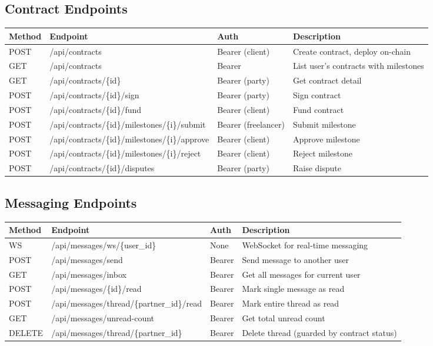 \documentclass[12pt,a4paper]{article}
\begin{document}
\subsection{Contract Endpoints}

\begin{longtable}{lllX}
\toprule
\textbf{Method} & \textbf{Endpoint} & \textbf{Auth} & \textbf{Description} \\
\midrule
\endhead
POST & /api/contracts & Bearer (client) & Create contract, deploy on-chain \\
GET & /api/contracts & Bearer & List user's contracts with milestones \\
GET & /api/contracts/\{id\} & Bearer (party) & Get contract detail \\
POST & /api/contracts/\{id\}/sign & Bearer (party) & Sign contract \\
POST & /api/contracts/\{id\}/fund & Bearer (client) & Fund contract \\
POST & /api/contracts/\{id\}/milestones/\{i\}/submit & Bearer (freelancer) & Submit milestone \\
POST & /api/contracts/\{id\}/milestones/\{i\}/approve & Bearer (client) & Approve milestone \\
POST & /api/contracts/\{id\}/milestones/\{i\}/reject & Bearer (client) & Reject milestone \\
POST & /api/contracts/\{id\}/disputes & Bearer (party) & Raise dispute \\
\bottomrule
\end{longtable}

\subsection{Messaging Endpoints}

\begin{longtable}{lllX}
\toprule
\textbf{Method} & \textbf{Endpoint} & \textbf{Auth} & \textbf{Description} \\
\midrule
\endhead
WS & /api/messages/ws/\{user\_id\} & None & WebSocket for real-time messaging \\
POST & /api/messages/send & Bearer & Send message to another user \\
GET & /api/messages/inbox & Bearer & Get all messages for current user \\
POST & /api/messages/\{id\}/read & Bearer & Mark single message as read \\
POST & /api/messages/thread/\{partner\_id\}/read & Bearer & Mark entire thread as read \\
GET & /api/messages/unread-count & Bearer & Get total unread count \\
DELETE & /api/messages/thread/\{partner\_id\} & Bearer & Delete thread (guarded by contract status) \\
\bottomrule
\end{longtable}
\end{document}
